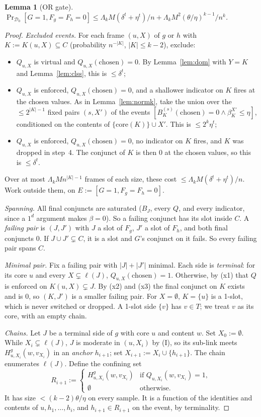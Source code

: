 \documentclass[11pt,a4paper]{article}
\theoremstyle{plain}
\newtheorem{lemma}[theorem]{Lemma}
\theoremstyle{definition}
\theoremstyle{remark}
\newcommand{\Dz}{\mathcal{D}_0}
\newcommand{\ones}{1^d}
\newcommand{\core}{\mathrm{core}}
\begin{document}
\begin{lemma}[OR gate]\label{lem:ork}
$\Pr_{\Dz}[G=1,F_g=F_h=0]\le \Lambda_kM(\delta^t+\eta^t)/n+\Lambda_kM^2(\theta/\eta)^{k-1}/n^k$.
\end{lemma}
\begin{proof}
\emph{Excluded events.} For each frame $(u,X)$ of $g$ or $h$ with $K:=K(u,X)\subseteq C$ (probability $n^{-|K|}$,
$|K|\le k-2$), exclude:
\begin{itemize}
  \item[(x1)] $Q_{u,X}$ is virtual and $Q_{u,X}(\text{chosen})=0$. By Lemma~\ref{lem:dom} with $Y=K$ and
    Lemma~\ref{lem:clss}, this is $\le\delta^t$;
  \item[(x2)] $Q_{u,X}$ is enforced, $Q_{u,X}(\text{chosen})=0$, and a shallower indicator on $K$ fires at the chosen
    values. As in Lemma~\ref{lem:normk}, take the union over the $\le2^{|K|-1}$ fixed pairs $(s,X')$ of the events
    $[B^{(s)}_K(\text{chosen})=0\wedge\beta^{X'}_K\le\eta]$, conditioned on the contents of $\{\core(K)\}\cup X'$. This is
    $\le2^{k}\eta^t$;
  \item[(x3)] $Q_{u,X}$ is enforced, $Q_{u,X}(\text{chosen})=0$, no indicator on $K$ fires, and $K$ was dropped in
    step~4. The conjunct of $K$ is then 0 at the chosen values, so this is $\le\delta^t$.
\end{itemize}
Over at most $\Lambda_kMn^{|K|-1}$ frames of each size, these cost $\le \Lambda_kM(\delta^t+\eta^t)/n$. Work outside them, on
$E:=[G=1,F_g=F_h=0]$.

\emph{Spanning.} All final conjuncts are saturated ($B_J$, every $Q$, and every indicator, since a $\ones$ argument
makes $\beta=0$). So a failing conjunct has its slot inside $C$. A \emph{failing pair} is $(J,J')$ with $J$ a slot
of $F_g$, $J'$ a slot of $F_h$, and both final conjuncts 0. If $J\cup J'\subsetneq C$, it is a slot and $G$'s
conjunct on it fails. So every failing pair spans $C$.

\emph{Minimal pair.} Fix a failing pair with $|J|+|J'|$ minimal. Each side is \emph{terminal}: for its core $u$ and
every $X\subsetneq\ell(J)$, $Q_{u,X}(\text{chosen})=1$. Otherwise, by (x1) that $Q$ is enforced on
$K(u,X)\subsetneq J$. By (x2) and (x3) the final conjunct on $K$ exists and is 0, so $(K,J')$ is a smaller failing
pair. For $X=\emptyset$, $K=\{u\}$ is a 1-slot, which is never switched or dropped. A 1-slot side $\{v\}$ has $v\in T$;
we treat $v$ as its core, with an empty chain.

\emph{Chains.} Let $J$ be a terminal side of $g$ with core $u$ and content $w$. Set $X_0:=\emptyset$. While
$X_i\subsetneq\ell(J)$, $J$ is moderate in $(u,X_i)$ by (I), so its sub-link meets $H^g_{u,X_i}(w,v_{X_i})$ in an
\emph{anchor} $h_{i+1}$; set $X_{i+1}:=X_i\cup\{h_{i+1}\}$. The chain enumerates $\ell(J)$. Define the confining set
\[
R_{i+1}:=\begin{cases}H^g_{u,X_i}(w,v_{X_i})&\text{if }Q_{u,X_i}(w,v_{X_i})=1,\\\emptyset&\text{otherwise.}\end{cases}
\]
It has size $<(k-2)\theta/\eta$ on every sample. It is a function of the identities and contents of
$u,h_1,\dots,h_i$, and $h_{i+1}\in R_{i+1}$ on the event, by terminality.


\end{proof}
\end{document}
